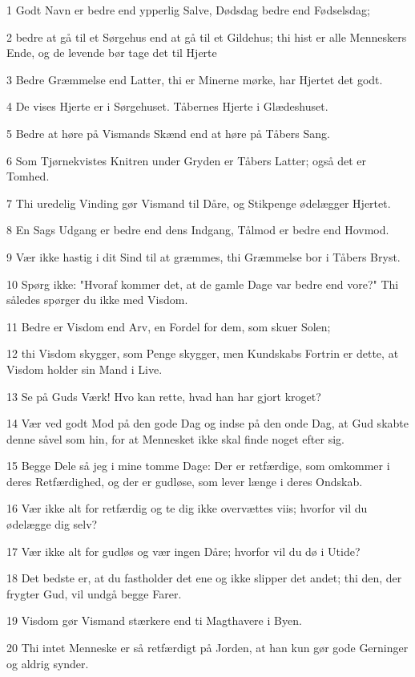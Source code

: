 \par 1 Godt Navn er bedre end ypperlig Salve, Dødsdag bedre end Fødselsdag;
\par 2 bedre at gå til et Sørgehus end at gå til et Gildehus; thi hist er alle Menneskers Ende, og de levende bør tage det til Hjerte
\par 3 Bedre Græmmelse end Latter, thi er Minerne mørke, har Hjertet det godt.
\par 4 De vises Hjerte er i Sørgehuset. Tåbernes Hjerte i Glædeshuset.
\par 5 Bedre at høre på Vismands Skænd end at høre på Tåbers Sang.
\par 6 Som Tjørnekvistes Knitren under Gryden er Tåbers Latter; også det er Tomhed.
\par 7 Thi uredelig Vinding gør Vismand til Dåre, og Stikpenge ødelægger Hjertet.
\par 8 En Sags Udgang er bedre end dens Indgang, Tålmod er bedre end Hovmod.
\par 9 Vær ikke hastig i dit Sind til at græmmes, thi Græmmelse bor i Tåbers Bryst.
\par 10 Spørg ikke: "Hvoraf kommer det, at de gamle Dage var bedre end vore?" Thi således spørger du ikke med Visdom.
\par 11 Bedre er Visdom end Arv, en Fordel for dem, som skuer Solen;
\par 12 thi Visdom skygger, som Penge skygger, men Kundskabs Fortrin er dette, at Visdom holder sin Mand i Live.
\par 13 Se på Guds Værk! Hvo kan rette, hvad han har gjort kroget?
\par 14 Vær ved godt Mod på den gode Dag og indse på den onde Dag, at Gud skabte denne såvel som hin, for at Mennesket ikke skal finde noget efter sig.
\par 15 Begge Dele så jeg i mine tomme Dage: Der er retfærdige, som omkommer i deres Retfærdighed, og der er gudløse, som lever længe i deres Ondskab.
\par 16 Vær ikke alt for retfærdig og te dig ikke overvættes viis; hvorfor vil du ødelægge dig selv?
\par 17 Vær ikke alt for gudløs og vær ingen Dåre; hvorfor vil du dø i Utide?
\par 18 Det bedste er, at du fastholder det ene og ikke slipper det andet; thi den, der frygter Gud, vil undgå begge Farer.
\par 19 Visdom gør Vismand stærkere end ti Magthavere i Byen.
\par 20 Thi intet Menneske er så retfærdigt på Jorden, at han kun gør gode Gerninger og aldrig synder.
